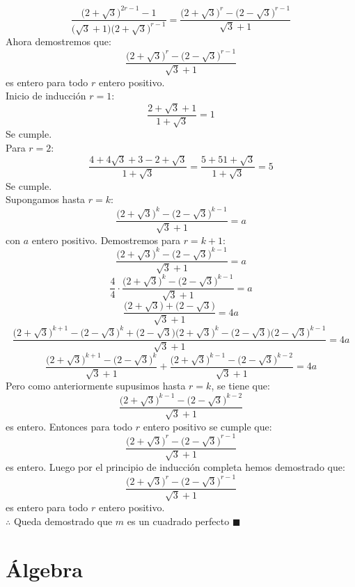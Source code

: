 \documentclass{book}
\begin{document}
\begin{enumerate}
          $$\frac{{\big(2+\sqrt{3}\big)}^{2r-1}-1}{\big(\sqrt{3}+1\big){\big(2+\sqrt{3}\big)}^{r-1}}=\frac{{\big(2+\sqrt{3}\big)}^{r}-{\big(2-\sqrt{3}\big)}^{r-1}}{\sqrt{3}+1}$$
          Ahora demostremos que:
          $$\frac{{\big(2+\sqrt{3}\big)}^{r}-{\big(2-\sqrt{3}\big)}^{r-1}}{\sqrt{3}+1}$$
          es entero para todo $r$ entero positivo.\\
          Inicio de inducción $r=1$:
          $$\frac{2+\sqrt{3}+1}{1+\sqrt{3}}=1$$
          Se cumple.\\
          Para $r=2$:
          $$\frac{4+4\sqrt{3}+3-2+\sqrt{3}}{1+\sqrt{3}}=\frac{5+51+\sqrt{3}}{1+\sqrt{3}}=5$$
          Se cumple.\\
          Supongamos hasta $r=k$:\\
          $$\frac{{\big(2+\sqrt{3}\big)}^{k}-{\big(2-\sqrt{3}\big)}^{k-1}}{\sqrt{3}+1}=a$$
          con $a$ entero positivo.
          Demostremos para $r=k+1$:
          $$\frac{{\big(2+\sqrt{3}\big)}^{k}-{\big(2-\sqrt{3}\big)}^{k-1}}{\sqrt{3}+1}=a$$
          $$\frac{4}{4}\cdot\frac{{\big(2+\sqrt{3}\big)}^{k}-{\big(2-\sqrt{3}\big)}^{k-1}}{\sqrt{3}+1}=a$$
          $$\frac{\big(2+\sqrt{3}\big)+\big(2-\sqrt{3}\big)}{\sqrt{3}+1}=4a$$
          $$\frac{{\big(2+\sqrt{3}\big)}^{k+1}-{\big(2-\sqrt{3}\big)}^{k}+\big(2-\sqrt{3}\big){\big(2+\sqrt{3}\big)}^{k}-\big(2-\sqrt{3}\big){\big(2-\sqrt{3}\big)}^{k-1}}{\sqrt{3}+1}=4a$$
          $$\frac{{\big(2+\sqrt{3}\big)}^{k+1}-{\big(2-\sqrt{3}\big)}^{k}}{\sqrt{3}+1}+\frac{{\big(2+\sqrt{3}\big)}^{k-1}-{\big(2-\sqrt{3}\big)}^{k-2}}{\sqrt{3}+1}=4a$$
          Pero como anteriormente supusimos hasta $r=k$, se tiene que:
          $$\frac{{\big(2+\sqrt{3}\big)}^{k-1}-{\big(2-\sqrt{3}\big)}^{k-2}}{\sqrt{3}+1}$$
          es entero. Entonces para todo $r$ entero positivo se cumple que:
          $$\frac{{\big(2+\sqrt{3}\big)}^{r}-{\big(2-\sqrt{3}\big)}^{r-1}}{\sqrt{3}+1}$$
          es entero. Luego por el principio de inducción completa hemos demostrado que:
          $$\frac{{\big(2+\sqrt{3}\big)}^{r}-{\big(2-\sqrt{3}\big)}^{r-1}}{\sqrt{3}+1}$$
          es entero para todo $r$ entero positivo.\\
          $\therefore$ Queda demostrado que $m$ es un cuadrado perfecto $\blacksquare$
\end{enumerate}


\chapter{Álgebra}
\end{document}
